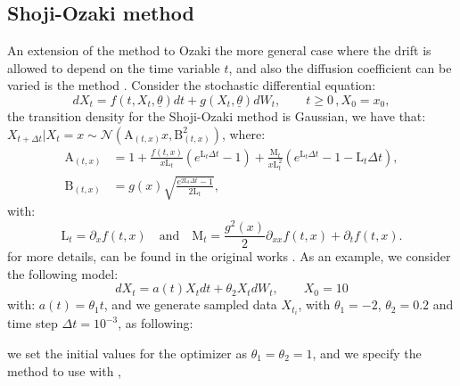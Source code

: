 \subsection{Shoji-Ozaki method}
An extension of the method to Ozaki the more general case where the drift is allowed to depend on the time variable $t$, and also the diffusion coefficient can be varied is the method \citet{ShojiandOzaki1998}. Consider the stochastic differential
equation:
\begin{equation}\label{eq13}
  dX_{t}= f(t,X_{t},\underline{\theta}) dt + g(X_{t},\underline{\theta}) dW_{t}, \quad \quad t \geq 0 \, , X_{0} = x_{0},
\end{equation}
the transition density for the Shoji-Ozaki method is Gaussian, we have that: $X_{t+\Delta t}|X_{t} = x \sim \mathcal{N}\left(\mathrm{A}_{(t,x)}x,\mathrm{B}^{2}_{(t,x)}\right)$, where:
\begin{align}\label{eq14}
  \mathrm{A}_{(t,x)} &= 1+ \frac{f(t,x)}{x\mathrm{L}_{t}} \left(e^{\mathrm{L}_{t}\Delta t }-1\right)+\frac{\mathrm{M}_{t}}{x\mathrm{L}^{2}_{t}} \left(e^{\mathrm{L}_{t} \Delta t}-1-\mathrm{L}_{t}\Delta t\right), \\
  \mathrm{B}_{(t,x)} &= g(x) \sqrt{\frac{e^{2\mathrm{L}_{t} \Delta t}-1}{2\mathrm{L}_{t}}},
\end{align}
with:
\begin{equation*}
  \mathrm{L}_{t} = \partial_{x} f(t,x) \quad\text{and}\quad  \mathrm{M}_{t} = \frac{g^{2}(x)}{2} \partial_{xx} f(t,x)+ \partial_{t} f(t,x).
\end{equation*}
for more details, can be found in the original works \citet{ShojiandOzaki1997,ShojiandOzaki1998}. As an example, we consider the following model:
\begin{equation}\label{eq15}
  dX_{t} = a(t)X_{t} dt + \theta_{2}X_{t} dW_{t},\qquad X_{0}=10
\end{equation}
with: $a(t) = \theta_{1}t$, and we generate sampled data $X_{t_{i}}$, with $\theta_{1}=-2$, $\theta_{2}=0.2$ and time step $\Delta t =10^{-3}$, as following:
\begin{Schunk}
\end{Schunk}
we set the initial values for the optimizer as $\theta_{1}=\theta_{2}=1$, and we specify the method to use with ,
